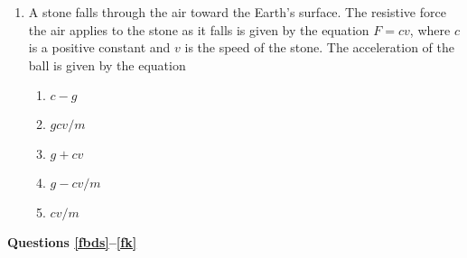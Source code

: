 \documentclass{../../../oss-apphys}
\begin{document}
\begin{multicols}{2}
\begin{enumerate}[resume,leftmargin=18pt]
  \item A stone falls through the air toward the Earth's surface. The resistive
    force the air applies to the stone as it falls is given by the equation
    $F=cv$, where $c$ is a positive constant and $v$ is the speed of the stone.
    The acceleration of the ball is given by the equation
    \begin{enumerate}[nosep,leftmargin=18pt,label=(\Alph*)]
    \item $c-g$
    \item $gcv/m$
    \item $g+cv$
    \item $g-cv/m$
    \item $cv/m$
    \end{enumerate}
  \end{enumerate}
  \columnbreak
  
  \textbf{Questions \ref{fbds}--\ref{fk}}


\end{multicols}
\end{document}
